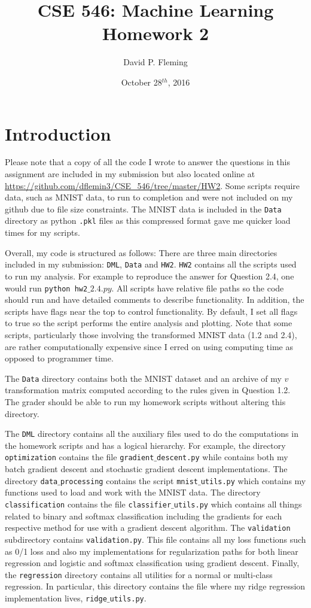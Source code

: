 \documentclass[12pt]{amsart}
\title{CSE 546: Machine Learning Homework 2}
\author{David P. Fleming}
\date{October 28$^{th}$, 2016}
\begin{document}
\maketitle
\tableofcontents

\section*{Introduction}

Please note that a copy of all the code I wrote to answer the questions in this assignment are included in my submission but also located online at \url{https://github.com/dflemin3/CSE_546/tree/master/HW2}.  Some scripts require data, such as MNIST data, to run to completion and were not included on my github due to file size constraints.  The MNIST data is included in the {\tt Data} directory as python {\tt .pkl} files as this compressed format gave me quicker load times for my scripts.

Overall, my code is structured as follows:  There are three main directories included in my submission: {\tt DML}, {\tt Data} and {\tt HW2}. {\tt HW2} contains all the scripts used to run my analysis.  For example to reproduce the answer for Question 2.4, one would run {\tt python hw2$\_2.4.py$}.  All scripts have relative file paths so the code should run and have detailed comments to describe functionality.  In addition, the scripts have flags near the top to control functionality.  By default, I set all flags to true so the script performs the entire analysis and plotting.  Note that some scripts, particularly those involving the transformed MNIST data (1.2 and 2.4), are rather computationally expensive since I erred on using computing time as opposed to programmer time.

The {\tt Data} directory contains both the MNIST dataset and an archive of my $v$ transformation matrix computed according to the rules given in Question 1.2.  The grader should be able to run my homework scripts without altering this directory.  

The {\tt DML} directory contains all the auxiliary files used to do the computations in the homework scripts and has a logical hierarchy.  For example, the directory {\tt optimization} contains the file {\tt gradient$\_$descent.py} while contains both my batch gradient descent and stochastic gradient descent implementations.  The directory {\tt data$\_$processing} contains the script {\tt mnist$\_$utils.py} which contains my functions used to load and work with the MNIST data.  The directory {\tt classification} contains the file {\tt classifier$\_$utils.py} which contains all things related to binary and softmax classification including the gradients for each respective method for use with a gradient descent algorithm.  The {\tt validation} subdirectory contains {\tt validation.py}.  This file contains all my loss functions such as 0/1 loss and also my implementations for regularization paths for both linear regression and logistic and softmax classification using gradient descent.  Finally, the {\tt regression} directory contains all utilities for a normal or multi-class regression.  In particular, this directory contains the file where my ridge regression implementation lives, {\tt ridge$\_$utils.py}. 
\end{document}
